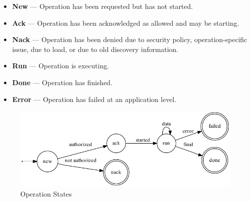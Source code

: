 \begin{itemize}
        \item \textbf{New} --- Operation has been requested but has not started.
        \item \textbf{Ack} --- Operation has been acknowledged as allowed and may be starting.
        \item \textbf{Nack} --- Operation has been denied due to security policy, operation-specific issue, due to load, or due to old discovery information.
        \item \textbf{Run} --- Operation is executing.
        \item \textbf{Done} --- Operation has finished.
        \item \textbf{Error} --- Operation has failed at an application level.
\end{itemize}

\begin{figure}
        \begin{center}\includegraphics[width=\myfigwidth,height=\myfigheight,keepaspectratio]{figs/dot/op_states}\end{center}
        \caption{Operation States}
        \label{fig:op-states}
\end{figure}
